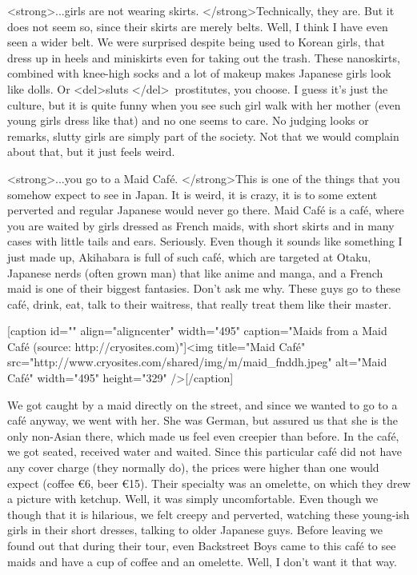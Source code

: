 \begin{post}
\begin{content}
<strong>...girls are not wearing skirts. </strong>Technically, they are. But it does not seem so, since their skirts are merely belts. Well, I think I have even seen a wider belt. We were surprised despite being used to Korean girls, that dress up in heels and miniskirts even for taking out the trash. These nanoskirts, combined with knee-high socks and a lot of makeup makes Japanese girls look like dolls. Or <del>sluts </del> prostitutes, you choose. I guess it's just the culture, but it is quite funny when you see such girl walk with her mother (even young girls dress like that) and no one seems to care. No judging looks or remarks, slutty girls are simply part of the society. Not that we would complain about that, but it just feels weird.



<strong>...you go to a Maid Café. </strong>This is one of the things that you somehow expect to see in Japan. It is weird, it is crazy, it is to some extent perverted and regular Japanese would never go there. Maid Café is a café, where you are waited by girls dressed as French maids, with short skirts and in many cases with little tails and ears. Seriously. Even though it sounds like something I just made up, Akihabara is full of such café, which are targeted at Otaku, Japanese nerds (often grown man) that like anime and manga, and a French maid is one of their biggest fantasies. Don't ask me why. These guys go to these café, drink, eat, talk to their waitress, that really treat them like their master.



[caption id="" align="aligncenter" width="495" caption="Maids from a Maid Café (source: http://cryosites.com)"]<img title="Maid Café" src="http://www.cryosites.com/shared/img/m/maid_fnddh.jpeg" alt="Maid Café" width="495" height="329" />[/caption]



We got caught by a maid directly on the street, and since we wanted to go to a café anyway, we went with her. She was German, but assured us that she is the only non-Asian there, which made us feel even creepier than before. In the café, we got seated, received water and waited. Since this particular café did not have any cover charge (they normally do), the prices were higher than one would expect (coffee €6, beer €15). Their specialty was an omelette, on which they drew a picture with ketchup. Well, it was simply uncomfortable. Even though we though that it is hilarious, we felt creepy and perverted, watching these young-ish girls in their short dresses, talking to older Japanese guys. Before leaving we found out that during their tour, even Backstreet Boys came to this café to see maids and have a cup of coffee and an omelette. Well, I don't want it that way.




\end{content}
\end{post}
